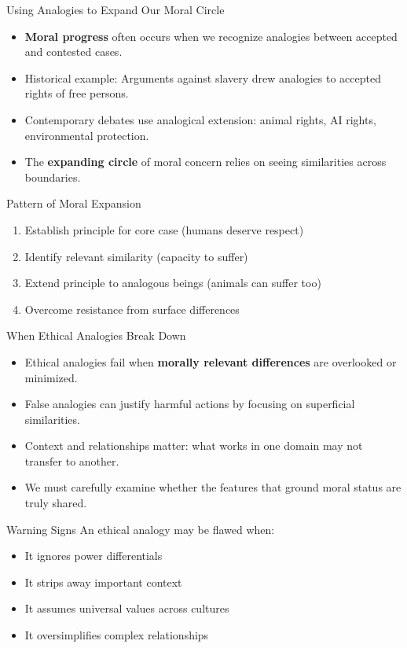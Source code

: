 \documentclass{beamer}
\begin{document}
	\begin{frame}{Using Analogies to Expand Our Moral Circle}
		\begin{itemize}
			\item \textbf{Moral progress} often occurs when we recognize analogies between accepted and contested cases.
			\item Historical example: Arguments against slavery drew analogies to accepted rights of free persons.
			\item Contemporary debates use analogical extension: animal rights, AI rights, environmental protection.
			\item The \textbf{expanding circle} of moral concern relies on seeing similarities across boundaries.
		\end{itemize}
		
		\begin{block}{Pattern of Moral Expansion}
			\begin{enumerate}
				\item Establish principle for core case (humans deserve respect)
				\item Identify relevant similarity (capacity to suffer)
				\item Extend principle to analogous beings (animals can suffer too)
				\item Overcome resistance from surface differences
			\end{enumerate}
		\end{block}
	\end{frame}
	
	\begin{frame}{When Ethical Analogies Break Down}
		\begin{itemize}
			\item Ethical analogies fail when \textbf{morally relevant differences} are overlooked or minimized.
			\item False analogies can justify harmful actions by focusing on superficial similarities.
			\item Context and relationships matter: what works in one domain may not transfer to another.
			\item We must carefully examine whether the features that ground moral status are truly shared.
		\end{itemize}
		
		\begin{alertblock}{Warning Signs}
			An ethical analogy may be flawed when:
			\begin{itemize}
				\item It ignores power differentials
				\item It strips away important context
				\item It assumes universal values across cultures
				\item It oversimplifies complex relationships
			\end{itemize}
		\end{alertblock}
	\end{frame}
	
\end{document}
